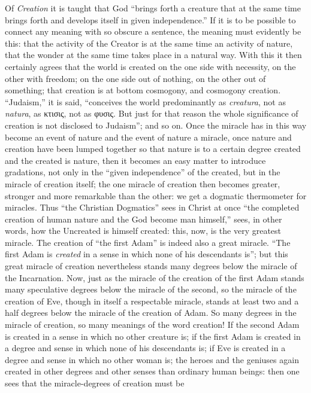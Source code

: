 \documentclass[12pt,a4paper]{article}
\newcommand{\opage}[1]{\marginnote{\footnotesize\textit{[#1]}}}
\begin{document}
Of \emph{Creation} it is taught that God ``brings forth a creature
that at the same time brings forth and develops itself in given
independence.'' If it is to be possible to connect any meaning with
so obscure a sentence, the meaning must evidently be this: that the
activity of the Creator is at the same time an activity of nature,
that the wonder at the same time takes place in a natural way. With
this it then certainly agrees that the world is created on the one
side with necessity, on the other with freedom; on the one side out
of nothing, on the other out of something; that creation is at
bottom cosmogony, and cosmogony creation. ``Judaism,'' it is said,
``conceives the world predominantly as \textit{creatura}, not as
\textit{natura}, as κτισις, not as φυσις. But just for that reason
the whole significance of creation is not disclosed to Judaism'';
and so on. Once the miracle has in this way become
\opage{7}%
an event of nature and the event of nature a miracle, once nature
and creation have been lumped together so that nature is to a
certain degree created and the created is nature, then it becomes an
easy matter to introduce gradations, not only in the ``given
independence'' of the created, but in the miracle of creation
itself; the one miracle of creation then becomes greater, stronger
and more remarkable than the other: we get a dogmatic thermometer
for miracles. Thus ``the Christian Dogmatics'' sees in Christ at
once ``the completed creation of human nature and the God become man
himself,'' sees, in other words, how the Uncreated is himself
created: this, now, is the very greatest miracle. The creation of
``the first Adam'' is indeed also a great miracle. ``The first Adam
is \emph{created} in a sense in which none of his descendants is'';
but this great miracle of creation nevertheless stands many degrees
below the miracle of the Incarnation. Now, just as the miracle of
the creation of the first Adam stands many speculative degrees below
the miracle of the second, so the miracle of the creation of Eve,
though in itself a respectable miracle, stands at least two and a
half degrees below the miracle of the creation of Adam. So many
degrees in the miracle of creation, so many meanings of the word
creation! If the second Adam is created in a sense in which no other
creature is; if the first Adam is created in a degree and sense in
which none of his descendants is; if Eve is created in a degree and
sense in which no other woman is; the heroes and the geniuses again
created in other degrees and other senses than ordinary human
beings: then one sees that the miracle-degrees of creation must be
\end{document}
